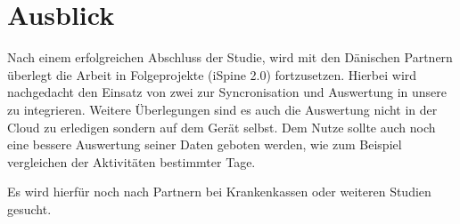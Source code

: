 \chapter{Ausblick}
Nach einem erfolgreichen Abschluss der Studie, wird mit den Dänischen Partnern überlegt die Arbeit in Folgeprojekte (iSpine 2.0) fortzusetzen. Hierbei wird  nachgedacht den Einsatz von zwei zur Syncronisation und Auswertung in unsere zu integrieren. Weitere Überlegungen sind es auch die Auswertung nicht in der Cloud zu erledigen sondern auf dem Gerät selbst. Dem Nutze sollte auch noch eine bessere Auswertung seiner Daten geboten werden, wie zum Beispiel vergleichen der Aktivitäten bestimmter Tage.

Es wird hierfür noch nach Partnern bei Krankenkassen oder weiteren Studien gesucht.

